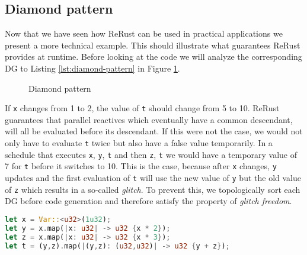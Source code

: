 \subsection{Diamond pattern}

Now that we have seen how \textsf{ReRust} can be used in practical applications we present a more technical example. This should illustrate what guarantees \textsf{ReRust} provides at runtime. Before looking at the code we will analyze the corresponding \ac{DG} to Listing \ref{lst:diamond-pattern} in Figure \ref{fig:diamond-pattern}.

\begin{figure}[htbp]
    \centering
    \caption{Diamond pattern}
    \label{fig:diamond-pattern}
\end{figure}

If \lstinline{x} changes from 1 to 2, the value of \lstinline{t} should change from 5 to 10. \textsf{ReRust} guarantees that parallel reactives which eventually have a common descendant, will all be evaluated before its descendant. If this were not the case, we would not only have to evaluate \lstinline{t} twice but also have a false value temporarily. In a schedule that executes \lstinline{x}, \lstinline{y}, \lstinline{t} and then \lstinline{z}, \lstinline{t} we would have a temporary value of 7 for \lstinline{t} before it switches to 10. This is the case, because after \lstinline{x} changes, \lstinline{y} updates and the first evaluation of \lstinline{t} will use the new value of \lstinline{y} but the old value of \lstinline{z} which results in a so-called \emph{glitch}. To prevent this, we topologically sort each \ac{DG} before code generation and therefore satisfy the property of \emph{glitch freedom}.

\begin{lstlisting}[language=Rust,style=colouredRust,caption=Diamond pattern written in ReRust,label=lst:diamond-pattern]
let x = Var::<u32>(1u32);
let y = x.map(|x: u32| -> u32 {x * 2});
let z = x.map(|x: u32| -> u32 {x * 3});
let t = (y,z).map(|(y,z): (u32,u32)| -> u32 {y + z});
\end{lstlisting}

